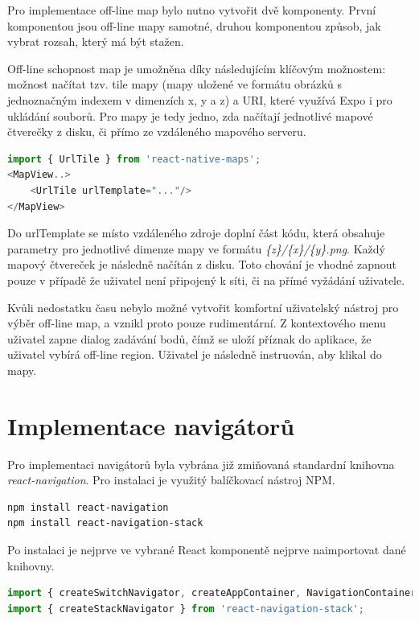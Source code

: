 Pro implementace off-line map bylo nutno vytvořit dvě komponenty. První komponentou jsou off-line mapy samotné, druhou komponentou způsob, jak vybrat rozsah, který má být stažen.

Off-line schopnost map je umožněna díky následujícím klíčovým možnostem: možnost načítat tzv. tile mapy (mapy uložené ve formátu obrázků s jednoznačným indexem v dimenzích x, y a z) a URI, které využívá Expo i pro ukládání souborů. Pro mapy je tedy jedno, zda načítají jednotlivé mapové čtverečky z disku, či přímo ze vzdáleného mapového serveru.

\begin{lstlisting}[language=JavaScript, caption=Off-line mapy]
import { UrlTile } from 'react-native-maps';
<MapView..>
	<UrlTile urlTemplate="..."/>
</MapView>
\end{lstlisting}

Do urlTemplate se místo vzdáleného zdroje doplní část kódu, která obsahuje parametry pro jednotlivé dimenze mapy ve formátu \emph{\{z\}/\{x\}/\{y\}.png}. Každý mapový čtvereček je následně načítán z disku. Toto chování je vhodné zapnout pouze v případě že uživatel není připojený k síti, či na přímé vyžádání uživatele.

Kvůli nedostatku času nebylo možné vytvořit komfortní uživatelský nástroj pro výběr off-line map, a vznikl proto pouze rudimentární. Z kontextového menu uživatel zapne dialog zadávání bodů, čímž se uloží příznak do aplikace, že uživatel vybírá off-line region. Uživatel je následně instruován, aby klikal do mapy.

\section{Implementace navigátorů}

Pro implementaci navigátorů byla vybrána již zmiňovaná standardní knihovna \emph{react-navigation}. Pro instalaci je využitý balíčkovací nástroj NPM.

\begin{lstlisting}[language=Bash, caption=Instalace react-navigation]
npm install react-navigation
npm install react-navigation-stack
\end{lstlisting}

Po instalaci je nejprve ve vybrané React komponentě nejprve naimportovat dané knihovny. 

\begin{lstlisting}[language=JavaScript, caption=Import knihoven pro hlavní navigátor]
import { createSwitchNavigator, createAppContainer, NavigationContainerComponent, NavigationActions } from 'react-navigation';
import { createStackNavigator } from 'react-navigation-stack';
\end{lstlisting}

